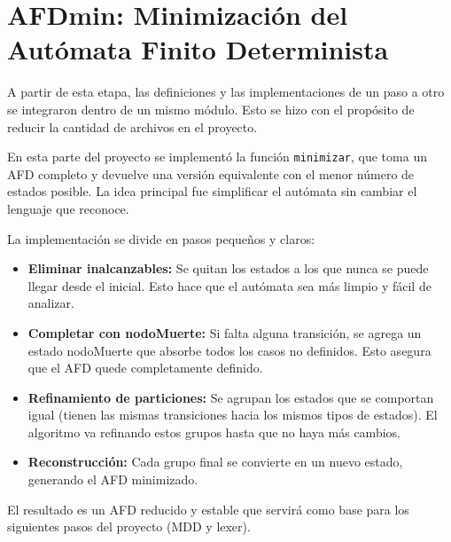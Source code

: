 
\section{AFDmin: Minimización del Autómata Finito Determinista}
A partir de esta etapa, las definiciones y las implementaciones de un paso a otro se integraron dentro de un mismo módulo. Esto se hizo con el propósito de reducir la cantidad de archivos en el proyecto.

En esta parte del proyecto se implementó la función \texttt{minimizar}, que toma un AFD completo y devuelve una versión equivalente con el menor número de estados posible. La idea principal fue simplificar el autómata sin cambiar el lenguaje que reconoce.

La implementación se divide en pasos pequeños y claros:
\begin{itemize}
  \item \textbf{Eliminar inalcanzables:} Se quitan los estados a los que nunca se puede llegar desde el inicial. Esto hace que el autómata sea más limpio y fácil de analizar.
  \item \textbf{Completar con nodoMuerte:} Si falta alguna transición, se agrega un estado nodoMuerte que absorbe todos los casos no definidos. Esto asegura que el AFD quede completamente definido.
  \item \textbf{Refinamiento de particiones:} Se agrupan los estados que se comportan igual (tienen las mismas transiciones hacia los mismos tipos de estados). El algoritmo va refinando estos grupos hasta que no haya más cambios.
  \item \textbf{Reconstrucción:} Cada grupo final se convierte en un nuevo estado, generando el AFD minimizado.
\end{itemize}

El resultado es un AFD reducido y estable que servirá como base para los siguientes pasos del proyecto (MDD y lexer). 
